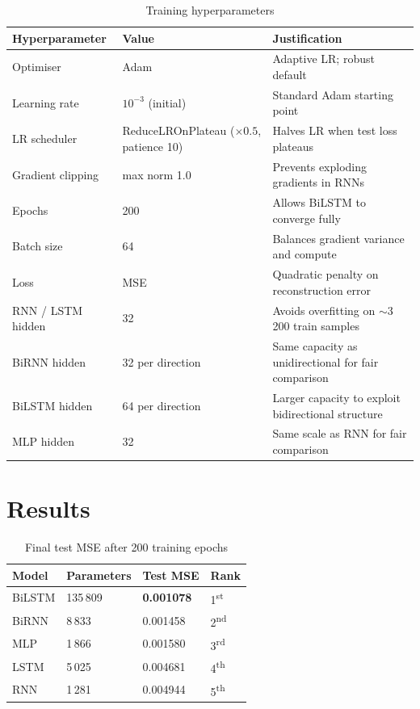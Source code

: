 \documentclass[12pt, a4paper]{article}
\begin{document}
\begin{table}[H]
\centering
\caption{Training hyperparameters}
\label{tab:hyper}
\begin{tabular}{lll}
\toprule
\textbf{Hyperparameter} & \textbf{Value} & \textbf{Justification} \\
\midrule
Optimiser            & Adam                           & Adaptive LR; robust default \\
Learning rate        & $10^{-3}$ (initial)            & Standard Adam starting point \\
LR scheduler         & ReduceLROnPlateau ($\times 0.5$, patience 10) & Halves LR when test loss plateaus \\
Gradient clipping    & max norm 1.0                   & Prevents exploding gradients in RNNs \\
Epochs               & 200                            & Allows BiLSTM to converge fully \\
Batch size           & 64                             & Balances gradient variance and compute \\
Loss                 & MSE                            & Quadratic penalty on reconstruction error \\
RNN / LSTM hidden    & 32                             & Avoids overfitting on $\sim$3\,200 train samples \\
BiRNN hidden         & 32 per direction               & Same capacity as unidirectional for fair comparison \\
BiLSTM hidden        & 64 per direction               & Larger capacity to exploit bidirectional structure \\
MLP hidden           & 32                             & Same scale as RNN for fair comparison \\
\bottomrule
\end{tabular}
\end{table}

\section{Results}
\label{sec:results}

\begin{table}[H]
\centering
\caption{Final test MSE after 200 training epochs}
\label{tab:results}
\begin{tabular}{llll}
\toprule
\textbf{Model} & \textbf{Parameters} & \textbf{Test MSE} & \textbf{Rank} \\
\midrule
BiLSTM & 135\,809 & \textbf{0.001078} & 1\textsuperscript{st} \\
BiRNN  & 8\,833   & 0.001458          & 2\textsuperscript{nd} \\
MLP    & 1\,866   & 0.001580          & 3\textsuperscript{rd} \\
LSTM   & 5\,025   & 0.004681          & 4\textsuperscript{th} \\
RNN    & 1\,281   & 0.004944          & 5\textsuperscript{th} \\
\bottomrule
\end{tabular}
\end{table}
\end{document}
